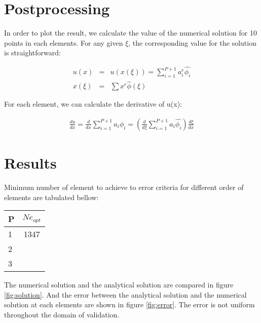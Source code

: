 \documentclass[paper=a4, fontsize=11pt]{article} %
\begin{document}
\section{Postprocessing}
In order to plot the result, we calculate the value of the numerical solution for 10 points in each elements. For any given $\xi$, the corresponding value for the solution is straightforward:

\begin{eqnarray}
 u(x) &=& u(x(\xi))=\sum_{i=1}^{P+1} a_i^e \hat{\phi_i}\nonumber\\
 x(\xi) &=& \sum x^e \hat{\phi}(\xi)
 \end{eqnarray} 

For each element, we can calculate the derivative of u(x):

\begin{eqnarray}
\frac{du}{dx} = \frac{d}{dx} \sum_{i=1}^{P+1} a_i \phi_i = (\frac{d}{d\xi}\sum_{i=1}^{P+1} a_i \hat{\phi_i})\frac{d\xi}{dx}
\end{eqnarray}

\section{Results}

Minimum number of element to achieve to error criteria for different order of elements are tabulated bellow: 

\begin{center}
  \begin{tabular}{ l | c}
    \hline
    P & $Ne_{opt}$\\ \hline
    1 & 1347\\ \hline
    2 &  \\ \hline
    3 & \\ \hline
    \hline
  \end{tabular}
\end{center}
The numerical solution and the analytical solution are compared in figure \ref{fig:solution}. And the error between the analytical solution and the numerical solution at each elements are shown in figure \ref{fig:error}. The error is not uniform throughout the domain of validation. 
\end{document}
